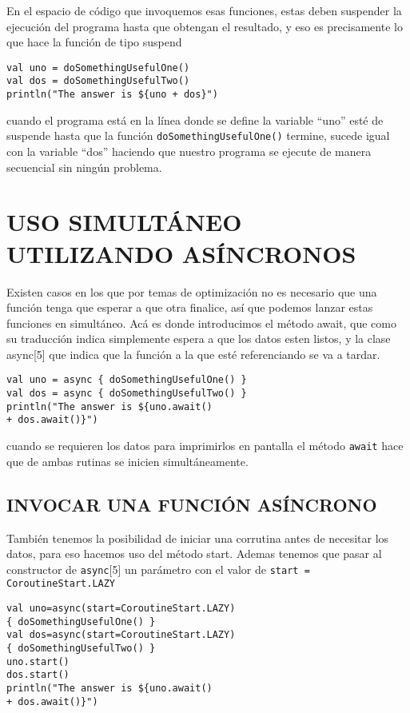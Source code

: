 \documentclass[twocolumn,10pt,abstract=on]{asme2ej}
\begin{document}
En el espacio de código que invoquemos esas funciones, estas deben suspender la ejecución del programa hasta que obtengan el resultado, y eso es precisamente lo que hace la función de tipo suspend

\begin{verbatim}
val uno = doSomethingUsefulOne()
val dos = doSomethingUsefulTwo()
println("The answer is ${uno + dos}")
\end{verbatim}

cuando el programa está en la línea donde se define la variable “uno” esté de suspende hasta que la función \verb+doSomethingUsefulOne()+ termine, sucede igual con la variable “dos” haciendo que nuestro programa se ejecute de manera secuencial sin ningún problema.

\section{USO SIMULTÁNEO UTILIZANDO ASÍNCRONOS}

Existen casos en los que por temas de optimización no es necesario que una función tenga que esperar a que otra finalice, así que podemos lanzar estas funciones en simultáneo.
Acá es donde introducimos el método await, que como su traducción indica simplemente espera a que los datos esten listos, y la clase async[5] que indica que la función a la que esté referenciando se va a tardar.

\begin{verbatim}
val uno = async { doSomethingUsefulOne() }
val dos = async { doSomethingUsefulTwo() }
println("The answer is ${uno.await() 
+ dos.await()}")
\end{verbatim}

cuando se requieren los datos para imprimirlos en pantalla el método \verb+await+ hace que de ambas rutinas se inicien simultáneamente.

\subsection{INVOCAR UNA FUNCIÓN ASÍNCRONO}

También tenemos la posibilidad de iniciar una corrutina antes de necesitar los datos, para eso hacemos uso del método start. Ademas tenemos que pasar al constructor de \verb+async+[5] un parámetro con el valor de \verb+start = CoroutineStart.LAZY+

\begin{verbatim}
val uno=async(start=CoroutineStart.LAZY)
{ doSomethingUsefulOne() }
val dos=async(start=CoroutineStart.LAZY) 
{ doSomethingUsefulTwo() }
uno.start()
dos.start()
println("The answer is ${uno.await() 
+ dos.await()}")
\end{verbatim}
\end{document}
